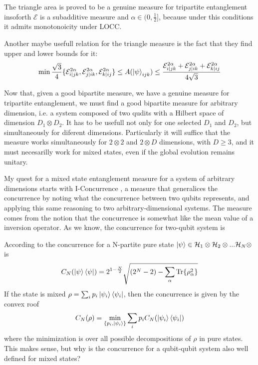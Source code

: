 The triangle area is proved to be a genuine measure for tripartite entanglement insoforth $\mathcal{E}$ is a subadditive measure and $\alpha\in(0,\frac{1}{2}]$, because under this conditions it admits monotonoicity under LOCC.

Another maybe usefull relation for the triangle measure is the fact that they find upper and lower bounds for it:
\begin{equation}
    \min\frac{\sqrt{3}}{4}\{\mathcal{E}^{2\alpha}_{i|jk},\mathcal{E}^{2\alpha}_{j|ik},\mathcal{E}^{2\alpha}_{k|ij}\}\leq A(\ket{\psi}_{ijk})\leq \frac{\mathcal{E}^{2\alpha}_{i|jk}+\mathcal{E}^{2\alpha}_{j|ik}+\mathcal{E}^{2\alpha}_{k|ij}}{4\sqrt{3}}
\end{equation}

Now that, given a good bipartite measure, we have a genuine measure for tripartite entanglement, we must find a good bipartite measure for arbitrary dimension, i.e. a system composed of two qudits with a Hilbert space of dimension $D_1\otimes D_2$. It has to be usefull not only for one selected $D_1$ and $D_2$, but simultaneously for diferent dimensions. Particularly it will suffice that the measure works simultaneously for $2\otimes2$ and $2\otimes D$ dimensions, with $D\geq3$, and it must necesarilly work for mixed states, even if the global evolution remains unitary. 

My quest for a mixed state entanglement measure for a system of arbitrary dimensions starts with I-Concurrence \cite{}, a measure that generalices the concurrence by noting what the concurrence between two qubits represents, and applying this same reasoning to two arbitrary-dimensional systems. The measure comes from the notion that the concurrence is somewhat like the mean value of a inversion operator. As we know, the concurrence for two-qubit system is 

According to \cite{https://scispace.com/pdf/genuine-multipartite-entanglement-detection-and-lower-bound-1j5nw9cffj.pdf} the concurrence for a N-partite pure state $\ket{\psi}\in\mathcal{H}_1\otimes\mathcal{H}_2\otimes...\mathcal{H}_N\otimes$ is 
\begin{equation}
    C_N(\ket{\psi}\bra{\psi})=2^{1-\frac{N}{2}}\sqrt{(2^N-2)-\sum_\alpha \text{Tr}\{\rho_\alpha^2\}}
\end{equation}
If the state is mixed $\rho=\sum_ip_i\ket{\psi_i}\bra{\psi_i}$, then the concurrence is given by the convex roof 
\begin{equation}
    C_N(\rho)=\min_{\{p_i,\ket{\psi_i}\}}\sum_ip_iC_N(\ket{\psi_i}\bra{\psi_i})
\end{equation}
where the minimization is over all possible decompositions of $\rho$ in pure states. 
This makes sense, but why is the concurrence for a qubit-qubit system also well defined for mixed states? 

